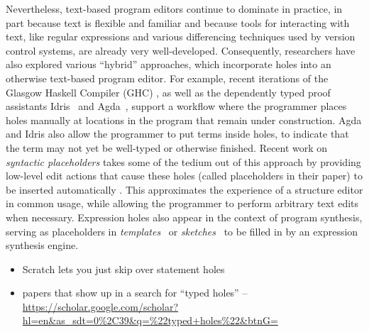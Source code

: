 
Nevertheless, text-based program editors continue to dominate in practice, in
part because text is flexible and familiar and because tools for interacting
with text, like regular expressions and various differencing techniques used by
version control systems, are already very well-developed.
%
Consequently, researchers have also explored various ``hybrid'' approaches,
which incorporate holes into an otherwise text-based program editor.
%
For example, recent iterations of the Glasgow Haskell Compiler (GHC)
\cite{GHCWIKI}, as well as the dependently typed proof assistants
Idris~\cite{brady2013idris} and Agda~\cite{norell2009dependently}, support a
workflow where the programmer places holes manually at locations in the program
that remain under construction. Agda and Idris also allow the programmer to put
terms inside holes, to indicate that the term may not yet be well-typed or
otherwise finished.
%
Recent work on \emph{syntactic placeholders} takes some of the tedium out of
this approach by providing low-level edit actions that cause these holes (called
placeholders in their paper) to be inserted automatically \cite{Amorim2016}. 
%
This approximates the experience of a structure editor in common usage, while
allowing the programmer to perform arbitrary text edits when necessary.
%
Expression holes also appear in the context of program synthesis, serving as
placeholders in \emph{templates}~\cite{srivastava2013template} or
\emph{sketches}~\cite{solar2009sketching} to be filled in by an expression
synthesis engine.

\begin{itemize}
	\item Scratch lets you just skip over statement holes
	\item papers that show up in a search for ``typed holes'' -- \url{https://scholar.google.com/scholar?hl=en&as_sdt=0%2C39&q=%22typed+holes%22&btnG=}
\end{itemize}


